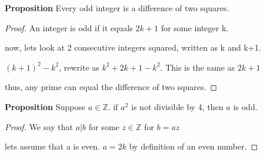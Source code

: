 \documentclass[12pt]{article}
\def\Z{\mathbb Z}
\begin{document}
{\bf Proposition} Every odd integer is a difference of two squares.
\begin{proof}
    An integer is odd if it equals $2k+1$ for some integer k.

    now, lets look at 2 consecutive integers squared, written as k and k+1.

    $(k+1)^2 - k^2$, rewrite as $k^2+2k+1-k^2$. This is the same as $2k+1$

    thus, any prime can equal the difference of two squares.

\end{proof}

{\bf Proposition} Suppose $a\in \Z$. if $a^2$ is not divisible by 4, then $a$ is odd.
\begin{proof}

    We say that $a|b$ for some $z\in\Z$ for $b=az$

    lets assume that a is even. $a=2k$ by definition of an even number.

    

\end{proof}
\end{document}
